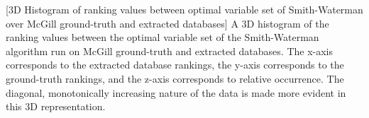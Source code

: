 [3D Histogram of ranking values between optimal variable set of Smith-Waterman over McGill ground-truth and extracted databases] A 3D histogram of the ranking values between the optimal variable set of the Smith-Waterman algorithm run on McGill ground-truth and extracted databases. The x-axis corresponds to the extracted database rankings, the y-axis corresponds to the ground-truth rankings, and the z-axis corresponds to relative occurrence. The diagonal, monotonically increasing nature of the data is made more evident in this 3D representation.